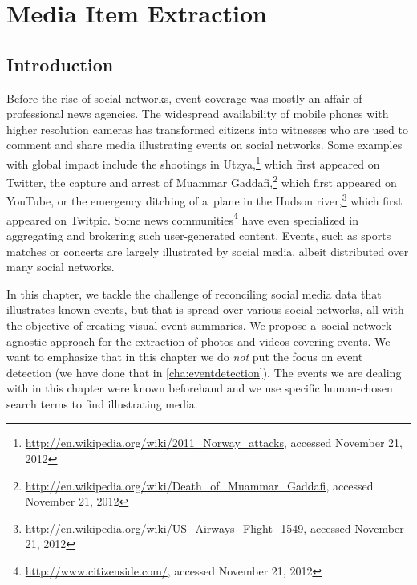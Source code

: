 \chapter{Media Item Extraction}
\label{cha:media-item-extraction}

\ifpdf
    \graphicspath{{5_media_item_extraction/figures/PNG/}{5_media_item_extraction/figures/PDF/}{5_media_item_extraction/figures/}}
\else
    \graphicspath{{5_media_item_extraction/figures/EPS/}{5_media_item_extraction/figures/}}
\fi

\section{Introduction}

Before the rise of social networks,
event coverage was mostly an affair of professional news agencies.
The widespread availability of mobile phones
with higher resolution cameras has transformed
citizens into witnesses who are used to comment
and share media illustrating events on social networks.
Some examples with global impact
include the shootings in
Ut{\o}ya,\footnote{\url{http://en.wikipedia.org/wiki/2011_Norway_attacks},
accessed November 21, 2012}
which first appeared on Twitter,
the capture and arrest of Muammar
Gaddafi,\footnote{\url{http://en.wikipedia.org/wiki/Death_of_Muammar_Gaddafi},
accessed November 21, 2012}
which first appeared on YouTube,
or the emergency ditching of a~plane in the Hudson
river,\footnote{\url{http://en.wikipedia.org/wiki/US_Airways_Flight_1549},
accessed November 21, 2012}
which first appeared on Twitpic.
Some news
communities\footnote{\url{http://www.citizenside.com/},
accessed November 21, 2012}
have even specialized in aggregating and brokering
such user-generated content.
Events, such as sports matches or concerts are 
largely illustrated by social media,
albeit distributed over many social networks.

In this chapter, we tackle the challenge of reconciling
social media data that illustrates known events,
but that is spread over various social networks,
all with the objective of creating visual event summaries.
We propose a~social-network-agnostic
approach for the extraction of photos and videos covering events.
We want to emphasize that in this chapter we do \emph{not}
put the focus on event detection (we have done that in \autoref{cha:eventdetection}). 
The events we are dealing with in this chapter
were known beforehand and we use specific
human-chosen search terms to find illustrating media.

